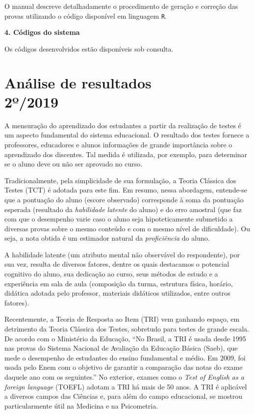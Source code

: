 \documentclass[a4paper]{report}
\begin{document}
O manual descreve detalhadamente o procedimento de geração e correção
das provas utilizando o código disponível em linguagem \texttt{R}.

\textbf{4. Códigos do sistema}

Os códigos desenvolvidos estão disponíveis sob consulta.

\newpage

\BgThispage
\chapter[Análise de resultados]{Análise de resultados \\ 2º/2019} \label{cap:AnaliseTRI}

\newpage

A mensuração do aprendizado dos estudantes a partir da realização de
testes é um aspecto fundamental do sistema educacional. O resultado dos
testes fornece a professores, educadores e alunos informações de grande
importância sobre o aprendizado dos discentes. Tal medida é utilizada,
por exemplo, para determinar se o aluno deve ou não ser aprovado no
curso.

Tradicionalmente, pela simplicidade de sua formulação, a Teoria Clássica
dos Testes (TCT) é adotada para este fim. Em resumo, nessa abordagem,
entende-se que a pontuação do aluno (escore observado) corresponde à
soma da pontuação esperada (resultado da \emph{habilidade latente} do
aluno) e do erro amostral (que faz com que o desempenho varie caso o
aluno seja hipoteticamente submetido a diversas provas sobre o mesmo
conteúdo e com o mesmo nível de dificuldade). Ou seja, a nota obtida é
um estimador natural da \emph{proficiência} do aluno.

A habilidade latente (um atributo mental não observável do respondente),
por sua vez, resulta de diversos fatores, dentre os quais destacamos o
potencial cognitivo do aluno, sua dedicação ao curso, seus métodos de
estudo e a experiência em sala de aula (composição da turma, estrutura
física, horário, didática adotada pelo professor, materiais didáticos
utilizados, entre outros fatores).

Recentemente, a Teoria de Resposta ao Item (TRI) vem ganhando espaço, em
detrimento da Teoria Clássica dos Testes, sobretudo para testes de
grande escala. De acordo com o Ministério da Educação, ``No Brasil, a
TRI é usada desde 1995 nas provas do Sistema Nacional de Avaliação da
Educação Básica (Saeb), que mede o desempenho de estudantes do ensino
fundamental e médio. Em 2009, foi usada pelo Enem com o objetivo de
garantir a comparação das notas do exame daquele ano com os seguintes.''
No exterior, exames como o \emph{Test of English as a foreign language}
(TOEFL) adotam a TRI há mais de 50 anos. A TRI é aplicável a diversos
campos das Ciências e, para além do campo educacional, se mostrou
particularmente útil na Medicina e na Psicometria.
\end{document}
